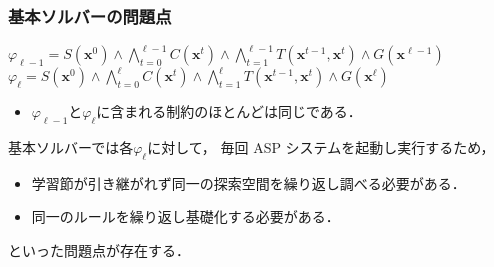 \documentclass[dvipdfmx,11pt]{beamer}
\begin{document}
\begin{frame}\frametitle{基本ソルバーの問題点}

  \begin{block}{}
    \centering
    $
    \varphi_{\ell-1} = S(\bm{x}^0)
    \land \bigwedge_{t=0}^{\ell-1} C(\bm{x}^t) 
    \land \bigwedge_{t=1}^{\ell-1} T(\bm{x}^{t-1},\bm{x}^{t})
    \land G(\bm{x}^{\ell-1})
    $
    $
      \varphi_{\ell} = S(\bm{x}^0)
      \land \bigwedge_{t=0}^{\ell} C(\bm{x}^t) 
      \land \bigwedge_{t=1}^{\ell} T(\bm{x}^{t-1},\bm{x}^{t})
      \land G(\bm{x}^\ell)
    $
  \end{block}
  
  
  \begin{itemize}
    \item $\varphi_{\ell-1}$と$\varphi_{\ell}$に含まれる制約のほとんどは同じである．
  \end{itemize}
  \begin{exampleblock}{}
    \centering
      \scalebox{0.8}{}
  \end{exampleblock}

  \bigskip

  基本ソルバーでは各$\varphi_{\ell}$に対して，
  毎回 ASP システムを起動し実行するため，
  \begin{itemize}
    \item 学習節が引き継がれず同一の探索空間を繰り返し調べる必要がある．
    \item 同一のルールを繰り返し基礎化する必要がある．
  \end{itemize}
  といった問題点が存在する．

\end{frame}
\end{document}

